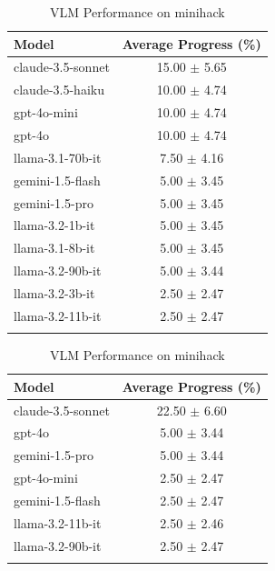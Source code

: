 \begin{table}[h]
    \centering
    \begin{minipage}[t]{0.48\linewidth}
    \centering
    \caption{LLM Performance on minihack}
    \begin{tabular}{lc}
    \hline
    Model & Average Progress (\%) \\
    \hline
    claude-3.5-sonnet & 15.00 $\pm$ 5.65 \\
    claude-3.5-haiku & 10.00 $\pm$ 4.74 \\
    gpt-4o-mini & 10.00 $\pm$ 4.74 \\
    gpt-4o & 10.00 $\pm$ 4.74 \\
    llama-3.1-70b-it & 7.50 $\pm$ 4.16 \\
    gemini-1.5-flash & 5.00 $\pm$ 3.45 \\
    gemini-1.5-pro & 5.00 $\pm$ 3.45 \\
    llama-3.2-1b-it & 5.00 $\pm$ 3.45 \\
    llama-3.1-8b-it & 5.00 $\pm$ 3.45 \\
    llama-3.2-90b-it & 5.00 $\pm$ 3.44 \\
    llama-3.2-3b-it & 2.50 $\pm$ 2.47 \\
    llama-3.2-11b-it & 2.50 $\pm$ 2.47 \\
    \hline
    \label{minihack_LLM}
    \end{tabular}
    \end{minipage}
    \hfill
    \begin{minipage}[t]{0.48\linewidth}
    \centering
    \caption{VLM Performance on minihack}
    \begin{tabular}{lc}
    \hline
    Model & Average Progress (\%) \\
    \hline
    claude-3.5-sonnet & 22.50 $\pm$ 6.60 \\
    gpt-4o & 5.00 $\pm$ 3.44 \\
    gemini-1.5-pro & 5.00 $\pm$ 3.44 \\
    gpt-4o-mini & 2.50 $\pm$ 2.47 \\
    gemini-1.5-flash & 2.50 $\pm$ 2.47 \\
    llama-3.2-11b-it & 2.50 $\pm$ 2.46 \\
    llama-3.2-90b-it & 2.50 $\pm$ 2.47 \\
    \hline
    \label{minihack_VLM}
    \end{tabular}
    \end{minipage}
\end{table}

